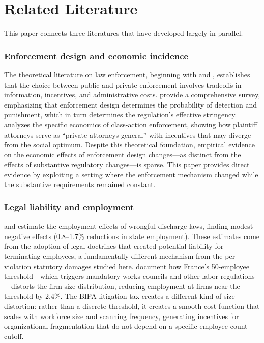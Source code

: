 \documentclass[12pt]{article}
\begin{document}
\section{Related Literature}
\label{sec:literature}

This paper connects three literatures that have developed largely in parallel.

\subsubsection*{Enforcement design and economic incidence} The theoretical literature on law enforcement, beginning with \citet{beckerstigler1974} and \citet{shavell1984}, establishes that the choice between public and private enforcement involves tradeoffs in information, incentives, and administrative costs. \citet{polinskys2000} provide a comprehensive survey, emphasizing that enforcement design determines the probability of detection and punishment, which in turn determines the regulation's effective stringency. \citet{coffee1986} analyzes the specific economics of class-action enforcement, showing how plaintiff attorneys serve as ``private attorneys general'' with incentives that may diverge from the social optimum. Despite this theoretical foundation, empirical evidence on the economic effects of enforcement design changes---as distinct from the effects of substantive regulatory changes---is sparse. This paper provides direct evidence by exploiting a setting where the enforcement mechanism changed while the substantive requirements remained constant.

\subsubsection*{Legal liability and employment} \citet{autordsh2006} and \citet{autor2007} estimate the employment effects of wrongful-discharge laws, finding modest negative effects (0.8--1.7\% reductions in state employment). These estimates come from the adoption of legal doctrines that created potential liability for terminating employees, a fundamentally different mechanism from the per-violation statutory damages studied here. \citet{garicano2016} document how France's 50-employee threshold---which triggers mandatory works councils and other labor regulations---distorts the firm-size distribution, reducing employment at firms near the threshold by 2.4\%. The BIPA litigation tax creates a different kind of size distortion: rather than a discrete threshold, it creates a smooth cost function that scales with workforce size and scanning frequency, generating incentives for organizational fragmentation that do not depend on a specific employee-count cutoff.
\end{document}
